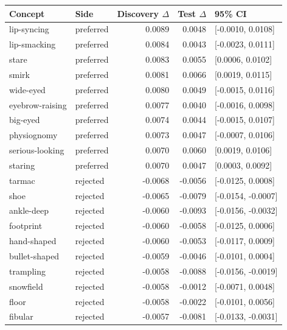 \begin{tabular}{llrrl}
\toprule
Concept & Side & Discovery $\Delta$ & Test $\Delta$ & 95\% CI \\
\midrule
lip-syncing & preferred & 0.0089 & 0.0048 & [-0.0010, 0.0108] \\
lip-smacking & preferred & 0.0084 & 0.0043 & [-0.0023, 0.0111] \\
stare & preferred & 0.0083 & 0.0055 & [0.0006, 0.0102] \\
smirk & preferred & 0.0081 & 0.0066 & [0.0019, 0.0115] \\
wide-eyed & preferred & 0.0080 & 0.0049 & [-0.0015, 0.0116] \\
eyebrow-raising & preferred & 0.0077 & 0.0040 & [-0.0016, 0.0098] \\
big-eyed & preferred & 0.0074 & 0.0044 & [-0.0015, 0.0107] \\
physiognomy & preferred & 0.0073 & 0.0047 & [-0.0007, 0.0106] \\
serious-looking & preferred & 0.0070 & 0.0060 & [0.0019, 0.0106] \\
staring & preferred & 0.0070 & 0.0047 & [0.0003, 0.0092] \\
tarmac & rejected & -0.0068 & -0.0056 & [-0.0125, 0.0008] \\
shoe & rejected & -0.0065 & -0.0079 & [-0.0154, -0.0007] \\
ankle-deep & rejected & -0.0060 & -0.0093 & [-0.0156, -0.0032] \\
footprint & rejected & -0.0060 & -0.0058 & [-0.0125, 0.0006] \\
hand-shaped & rejected & -0.0060 & -0.0053 & [-0.0117, 0.0009] \\
bullet-shaped & rejected & -0.0059 & -0.0046 & [-0.0101, 0.0004] \\
trampling & rejected & -0.0058 & -0.0088 & [-0.0156, -0.0019] \\
snowfield & rejected & -0.0058 & -0.0012 & [-0.0071, 0.0048] \\
floor & rejected & -0.0058 & -0.0022 & [-0.0101, 0.0056] \\
fibular & rejected & -0.0057 & -0.0081 & [-0.0133, -0.0031] \\
\bottomrule
\end{tabular}
